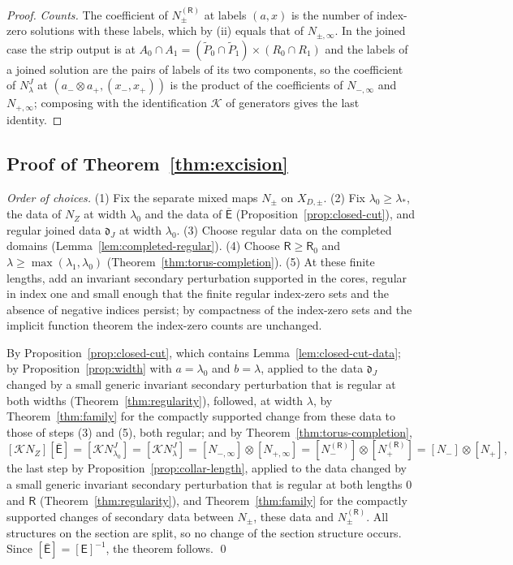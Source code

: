 \documentclass[11pt]{amsart}
\theoremstyle{definition}
\theoremstyle{remark}
\theoremstyle{plain}
\numberwithin{equation}{section}
\begin{document}
\begin{proof}
\emph{Counts.} The coefficient of $N^{(\mathsf R)}_\pm$ at labels $(a,x)$ is the number of
index-zero solutions with these labels, which by (ii) equals that of $N_{\pm,\infty}$.
In the joined case the strip output is at $A_0\cap A_1=(\widetilde P_0\cap\widetilde P_1)\times(R_0\cap R_1)$
and the labels of a joined solution are the pairs of labels of its two
components, so the coefficient of $N^J_\lambda$ at $(a_-\otimes a_+,(x_-,x_+))$ is the
product of the coefficients of $N_{-,\infty}$ and $N_{+,\infty}$; composing with the
identification $\mathcal K$ of generators gives the last identity.
\end{proof}

\subsection{Proof of Theorem~\ref{thm:excision}}

\emph{Order of choices.} (1) Fix the separate mixed maps $N_\pm$ on $X_{D,\pm}$.
(2) Fix $\lambda_0\ge\lambda_*$, the data of $N_Z$ at width $\lambda_0$ and the data of
$\overline{\mathsf E}$ (Proposition~\ref{prop:closed-cut}), and regular joined data $\mathfrak d_J$
at width $\lambda_0$. (3) Choose regular data on the completed domains
(Lemma~\ref{lem:completed-regular}). (4) Choose $\mathsf R\ge \mathsf R_0$ and $\lambda\ge\max(\lambda_1,\lambda_0)$
(Theorem~\ref{thm:torus-completion}). (5) At these finite lengths, add an invariant
secondary perturbation supported in the cores, regular in index one and small
enough that the finite regular index-zero sets and the absence of negative indices
persist; by compactness of the index-zero sets and the implicit function theorem
the index-zero counts are unchanged.

By Proposition~\ref{prop:closed-cut}, which contains Lemma~\ref{lem:closed-cut-data};
by Proposition~\ref{prop:width} with $a=\lambda_0$ and $b=\lambda$, applied to the
data $\mathfrak d_J$ changed by a small generic invariant secondary perturbation that
is regular at both widths (Theorem~\ref{thm:regularity}), followed, at width
$\lambda$, by Theorem~\ref{thm:family} for the compactly supported change from these
data to those of steps (3) and (5), both regular; and by
Theorem~\ref{thm:torus-completion},
\[
[\mathcal KN_Z][\overline{\mathsf E}]=[\mathcal KN^J_{\lambda_0}]=[\mathcal KN^J_\lambda]=[N_{-,\infty}]\otimes[N_{+,\infty}]
=[N_-^{(\mathsf R)}]\otimes[N_+^{(\mathsf R)}]=[N_-]\otimes[N_+],
\]
the last step by Proposition~\ref{prop:collar-length}, applied to the data changed by a
small generic invariant secondary perturbation that is regular at both lengths $0$ and
$\mathsf R$ (Theorem~\ref{thm:regularity}), and Theorem~\ref{thm:family} for the compactly
supported changes of secondary data between $N_\pm$, these data and $N^{(\mathsf R)}_\pm$.
All structures on the section are split, so no change of the section structure
occurs. Since $[\overline{\mathsf E}]=[\mathsf E]^{-1}$, the theorem follows. \qed
\end{document}
